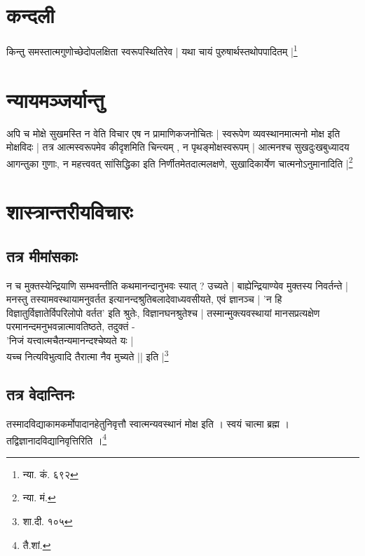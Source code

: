 \section{कन्दली} किन्तु समस्तात्मगुणोच्छेदोपलक्षिता स्वरूपस्थितिरेव | यथा चायं पुरुषार्थस्तथोपपादितम् |\footnote{न्या. कं. ६९२}

\section{न्यायमञ्जर्यान्तु} अपि च मोक्षे सुखमस्ति न वेति विचार एष न प्रामाणिकजनोचितः | स्वरूपेण व्यवस्थानमात्मनो मोक्ष इति मोक्षविदः | तत्र आत्मस्वरूपमेव कीदृशमिति चिन्त्यम् , न पृथङ्मोक्षस्वरूपम् | आत्मनश्च सुखदुःखबुध्यादय आगन्तुका गुणाः, न महत्त्ववत् सांसिद्धिका इति निर्णीतमेतदात्मलक्षणे, सुखादिकार्येण चात्मनोऽनुमानादिति |\footnote{न्या. मं. }

\section{शास्त्रान्तरीयविचारः}

\subsection{तत्र मीमांसकाः} न च मुक्तस्येन्द्रियाणि सम्भवन्तीति कथमानन्दानुभवः स्यात् ? उच्यते | बाह्येन्द्रियाण्येव मुक्तस्य निवर्तन्ते | मनस्तु तस्यामवस्थायामनुवर्तत इत्यानन्दश्रुतिबलादेवाध्यवसीयते, एवं ज्ञानञ्च | 'न हि विज्ञातुर्विज्ञातेर्विपरिलोपो वर्तत' इति श्रुतेः, विज्ञानघनश्रुतेश्च | तस्मान्मुक्त्यवस्थायां मानसप्रत्यक्षेण परमानन्दमनुभवन्नात्मावतिष्ठते, तदुक्तं -\\ 'निजं यत्त्वात्मचैतन्यमानन्दश्चेष्यते यः |\\ यच्च नित्यविभुत्वादि तैरात्मा नैव मुच्यते || इति |\footnote{शा.दी. १०५}

\subsection{तत्र वेदान्तिनः} तस्मादविद्याकामकर्मोपादानहेतुनिवृत्तौ स्वात्मन्यवस्थानं मोक्ष इति । स्वयं चात्मा ब्रह्म । तद्विज्ञानादविद्यानिवृत्तिरिति ।\footnote{तै.शां.}
